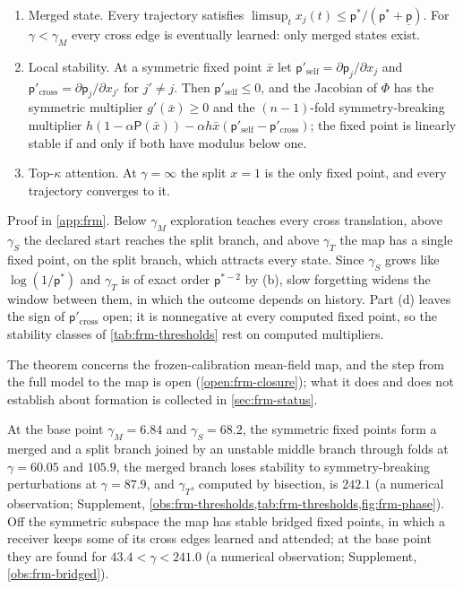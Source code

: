 \begin{theorem}
\begin{enumerate}
\item[(c)] Merged state. Every trajectory satisfies $\limsup_tx_j(t)\le\mathsf p^\ast/(\mathsf p^\ast+\underline{\mathsf p})$. For $\gamma<\gamma_M$ every cross edge is eventually learned: only merged states exist.
\item[(d)] Local stability. At a symmetric fixed point $\bar x$ let $\mathsf p'_{\mathrm{self}}=\partial\mathsf p_j/\partial x_j$ and $\mathsf p'_{\mathrm{cross}}=\partial\mathsf p_j/\partial x_{j'}$ for $j'\ne j$. Then $\mathsf p'_{\mathrm{self}}\le0$, and the Jacobian of $\Phi$ has the symmetric multiplier $g'(\bar x)\ge0$ and the $(n-1)$-fold symmetry-breaking multiplier $h(1-\alpha\mathsf P(\bar x))-\alpha h\bar x(\mathsf p'_{\mathrm{self}}-\mathsf p'_{\mathrm{cross}})$; the fixed point is linearly stable if and only if both have modulus below one.
\item[(e)] Top-$\kappa$ attention. At $\gamma=\infty$ the split $x=1$ is the only fixed point, and every trajectory converges to it.
\end{enumerate}
\end{theorem}
Proof in \cref{app:frm}. Below $\gamma_M$ exploration teaches every cross translation, above $\gamma_S$ the declared start reaches the split branch, and above $\gamma_T$ the map has a single fixed point, on the split branch, which attracts every state. Since $\gamma_S$ grows like $\log(1/\mathsf p^\ast)$ and $\gamma_T$ is of exact order $\mathsf p^{\ast-2}$ by (b), slow forgetting widens the window between them, in which the outcome depends on history. Part (d) leaves the sign of $\mathsf p'_{\mathrm{cross}}$ open; it is nonnegative at every computed fixed point, so the stability classes of \cref{tab:frm-thresholds} rest on computed multipliers.

The theorem concerns the frozen-calibration mean-field map, and the step from the full model to the map is open (\cref{open:frm-closure}); what it does and does not establish about formation is collected in \cref{sec:frm-status}.

At the base point $\gamma_M=6.84$ and $\gamma_S=68.2$, the symmetric fixed points form a merged and a split branch joined by an unstable middle branch through folds at $\gamma=60.05$ and $105.9$, the merged branch loses stability to symmetry-breaking perturbations at $\gamma=87.9$, and $\gamma_T$, computed by bisection, is $242.1$ (a numerical observation; Supplement, \cref{obs:frm-thresholds,tab:frm-thresholds,fig:frm-phase}). Off the symmetric subspace the map has stable bridged fixed points, in which a receiver keeps some of its cross edges learned and attended; at the base point they are found for $43.4<\gamma<241.0$ (a numerical observation; Supplement, \cref{obs:frm-bridged}).

